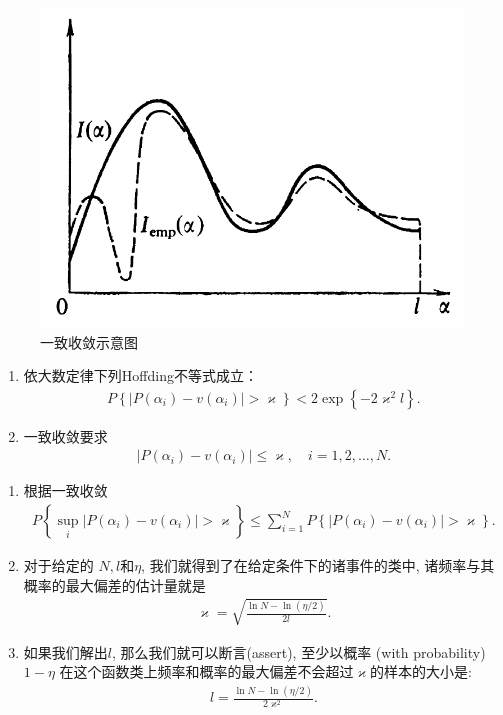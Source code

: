 \documentclass[compress,10pt,dvipsnames,notheorems]{beamer} %
\begin{document}
\begin{frame}
\begin{figure}
\centering
\includegraphics[width=.5\linewidth]{Imgs/frequency.png}
\caption{一致收敛示意图}
\label{fig:frequency}
\end{figure}
\begin{enumerate}
\item 依大数定律下列Hoffding不等式成立：
\begin{align}\label{ch6.15}
P\left\{\left|P\left(\alpha_{i}\right)-v\left(\alpha_{i}\right)\right|>\varkappa\right\}<2 \exp \left\{-2 \varkappa^{2} l\right\}.
\end{align}
\item 一致收敛要求
\begin{align*}
\left|P\left(\alpha_{i}\right)-v\left(\alpha_{i}\right)\right| \leq \varkappa, \quad i=1,2, \ldots, N.
\end{align*}
\end{enumerate}
\end{frame}

\begin{frame}{}
\begin{enumerate}
\item 根据一致收敛
\begin{align*}
P\left\{\sup _{i}\left|P\left(\alpha_{i}\right)-v\left(\alpha_{i}\right)\right|>\varkappa\right\} \leq \sum_{i=1}^{N} P\left\{\left|P\left(\alpha_{i}\right)-v\left(\alpha_{i}\right)\right|>\varkappa\right\}.
\end{align*}
\item 对于给定的 $N, l$和$\eta$, 我们就得到了在给定条件下的诸事件的类中, 诸频率与其概率的最大偏差的估计量就是
\begin{align}\label{ch6.19}
\varkappa=\sqrt{\frac{\ln N-\ln (\eta / 2)}{2 l}}.
\end{align}
\item 如果我们解出$l$, 那么我们就可以断言(assert), 至少以概率 (with probability) $1-\eta$ 在这个函数类上频率和概率的最大偏差不会超过$\varkappa$的样本的大小是:
\begin{align}\label{ch6.20}
l=\frac{\ln N-\ln (\eta / 2)}{2 \varkappa^{2}}.
\end{align}
\end{enumerate}
\end{frame}
\end{document}
